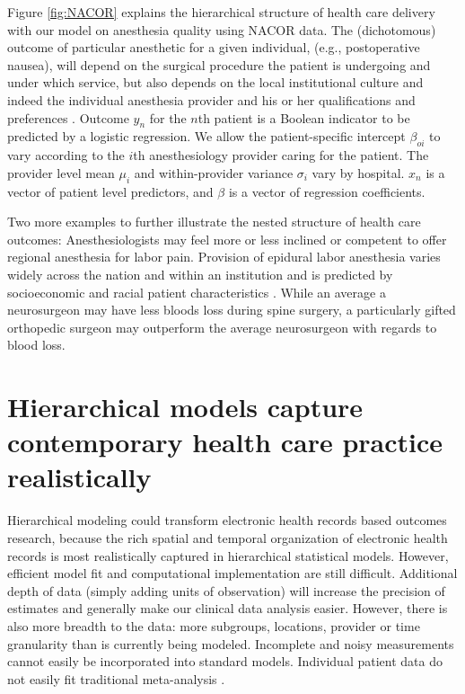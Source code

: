 \documentclass[11pt,notitlepage]{article}
\begin{document}
Figure \ref{fig:NACOR} explains the hierarchical structure of health care delivery with our model on anesthesia quality 
using NACOR data. The (dichotomous) outcome of particular anesthetic for a given individual, (e.g., postoperative nausea), 
will depend on the surgical procedure the patient is undergoing and under which service, but also depends on the local 
institutional culture and indeed the individual anesthesia provider and his or her qualifications and preferences \cite{AndreaeWhite2015}. 
Outcome $y_n$ for the $n$th patient is a Boolean indicator to be predicted by a logistic regression. We allow the patient-specific
intercept $\beta_{oi}$ to vary according to the $i$th anesthesiology provider caring for the patient. The provider level mean 
$\mu_i$ and within-provider variance $\sigma_i$ vary by hospital. $x_n$ is a vector of patient level predictors, and $\beta$ is a vector 
of regression coefficients.  

Two more examples to further 
illustrate the nested structure of health care outcomes: 
Anesthesiologists may feel more or less inclined or competent to offer 
regional anesthesia for labor pain. Provision of epidural labor 
anesthesia varies widely across the nation and within an institution and 
is predicted by socioeconomic and racial patient characteristics 
\cite{Rust2004,Glance2007}.  
While an average a neurosurgeon may have less bloods loss during spine 
surgery, a particularly gifted orthopedic surgeon may outperform the 
average neurosurgeon with regards to blood loss.

\section*{Hierarchical models capture contemporary health care practice realistically}
Hierarchical modeling could transform electronic health records based 
outcomes research, because the rich spatial and temporal 
organization of electronic health records is most realistically 
captured in hierarchical statistical models. However, efficient model 
fit and computational implementation are still difficult.  
Additional depth of data (simply adding units of observation) will increase 
the precision of estimates and generally make our clinical data analysis easier. 
However, there is also more breadth to the data: 
more subgroups, locations, provider or time granularity than is currently 
being modeled. Incomplete and noisy 
measurements cannot easily be incorporated into standard models. 
Individual patient data do not easily fit traditional meta-analysis
\cite{Andreae2015,Andreae2012}.
\end{document}
